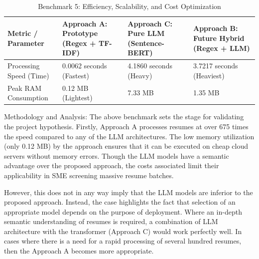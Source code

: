 \begin{table}[H]
\centering
\caption{Benchmark 5: Efficiency, Scalability, and Cost Optimization}
\begin{tabularx}{\textwidth}{p{}Y Y Y}
\toprule
\textbf{Metric / Parameter} & \textbf{Approach A: Prototype (Regex + TF-IDF)} & \textbf{Approach C: Pure LLM (Sentence-BERT)} & \textbf{Approach B: Future Hybrid (Regex + LLM)}\\
\midrule
Processing Speed (Time) & 0.0062 seconds (Fastest) & 4.1860 seconds (Heavy) & 3.7217 seconds (Heaviest)\\
Peak RAM Consumption & 0.12 MB (Lightest) & 7.33 MB & 1.35 MB\\
\bottomrule
\end{tabularx}
\end{table}

Methodology and Analysis: The above benchmark sets the stage for validating the project hypothesis. Firstly, Approach A processes resumes at over 675 times the speed compared to any of the LLM architectures. The low memory utilization (only 0.12 MB) by the approach ensures that it can be executed on cheap cloud servers without memory errors. Though the LLM models have a semantic advantage over the proposed approach, the costs associated limit their applicability in SME screening massive resume batches.

However, this does not in any way imply that the LLM models are inferior to the proposed approach. Instead, the case highlights the fact that selection of an appropriate model depends on the purpose of deployment. Where an in-depth semantic understanding of resumes is required, a combination of LLM architecture with the transformer (Approach C) would work perfectly well. In cases where there is a need for a rapid processing of several hundred resumes, then the Approach A becomes more appropriate.
